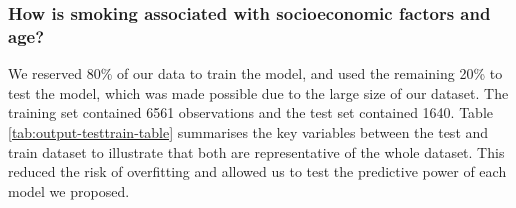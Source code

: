 \documentclass[
  11pt,
  twocolumn]{article}
\begin{document}
\subsubsection{How is smoking associated with socioeconomic factors and
age?}\label{how-is-smoking-associated-with-socioeconomic-factors-and-age}

We reserved 80\% of our data to train the model, and used the remaining
20\% to test the model, which was made possible due to the large size of
our dataset. The training set contained 6561 observations and the test
set contained 1640. Table \ref{tab:output-testtrain-table} summarises
the key variables between the test and train dataset to illustrate that
both are representative of the whole dataset. This reduced the risk of
overfitting and allowed us to test the predictive power of each model we
proposed.
\end{document}
